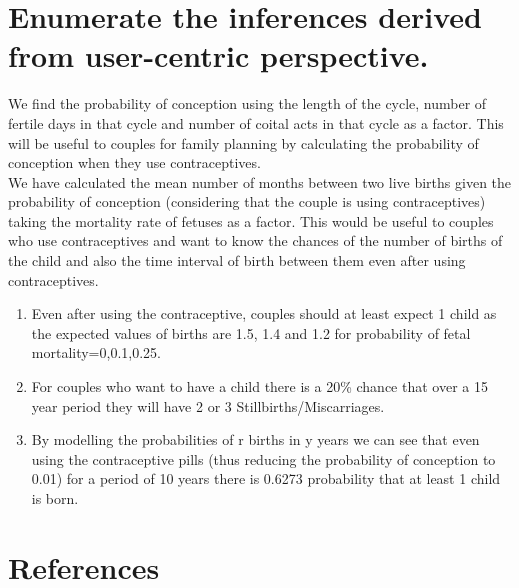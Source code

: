 \documentclass{article}
\begin{document}
\section{Enumerate the inferences derived from user-centric perspective.}
We find the probability of conception using the length of the cycle, number of fertile days in that cycle and number of coital acts in that cycle as a factor. This will be useful to couples for family planning by calculating the probability of conception when they use contraceptives.\\

We have calculated the mean number of months between two live births given the probability of conception (considering that the couple is using contraceptives) taking the mortality rate of fetuses as a factor. This would be useful to couples who use contraceptives and want to know the chances of the number of births of the child and also the time interval of birth between them even after using contraceptives.\\


\begin{enumerate}
\item Even after using the contraceptive, couples should at least expect 1 child as the expected values of births are 1.5, 1.4 and 1.2 for probability of fetal mortality=0,0.1,0.25.
\item For couples who want to have a child there is a 20\% chance that over a 15 year period they will have 2 or 3 Stillbirths/Miscarriages.
\item By modelling the probabilities of r births in y years we can see that even using the contraceptive pills (thus reducing the probability of conception to 0.01) for a period of 10 years there is 0.6273 probability that at least 1 child is born.
\end{enumerate} 

\section{References}




\end{document}
